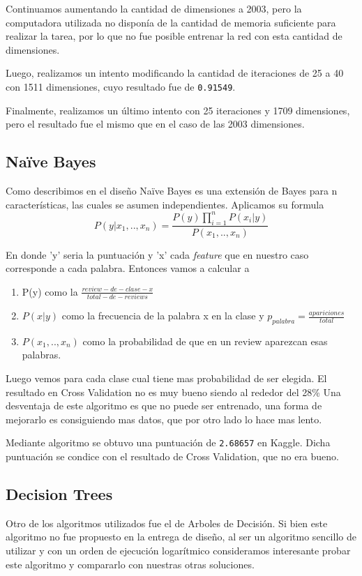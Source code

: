 \documentclass[10pt,a4paper]{article}
\begin{document}
Continuamos aumentando la cantidad de dimensiones a 2003, pero la computadora utilizada no disponía de la cantidad de memoria suficiente para realizar la tarea, por lo que no fue posible entrenar la red con esta cantidad de dimensiones.

Luego, realizamos un intento modificando la cantidad de iteraciones de 25 a 40 con 1511 dimensiones, cuyo resultado fue de \texttt{0.91549}.

Finalmente, realizamos un último intento con 25 iteraciones y 1709 dimensiones, pero el resultado fue el mismo que en el caso de las 2003 dimensiones. 

\subsection{Naïve Bayes}
Como describimos en el diseño Naïve Bayes es una extensión de Bayes para n características, las cuales se asumen independientes. Aplicamos su formula
\begin{equation*}
    P(y|x_1,..,x_n) = \frac {P(y)\prod_{i = 1}^{n} {P(x_i|y)}} {P(x_1,..,x_n)}
\end{equation*}

En donde 'y' seria la puntuación y 'x' cada \textit{feature} que en nuestro caso corresponde a cada palabra. Entonces vamos a calcular a 

\begin{enumerate}
    \item P(y) como la $\frac {review-de-clase-x}{total-de-reviews}$
    \item $P(x|y)$ como la frecuencia de la palabra x en la clase y $ p_{palabra} = \frac{apariciones}{total} $ 
    \item $P(x_1,..,x_n)$ como la probabilidad de que en un review aparezcan esas palabras.
\end{enumerate}

Luego vemos para cada clase cual tiene mas probabilidad de ser elegida. El resultado en Cross Validation no es muy bueno siendo al rededor del 28\% 
Una desventaja de este algoritmo es que no puede ser entrenado, una forma de mejorarlo es consiguiendo mas datos, que por otro lado lo hace mas lento.

Mediante algoritmo se obtuvo una puntuación de \texttt{2.68657} en Kaggle. Dicha puntuación se condice con el resultado de Cross Validation, que no era bueno. 

\subsection{Decision Trees}
Otro de los algoritmos utilizados fue el de Arboles de Decisión. Si bien este algoritmo no fue propuesto en la entrega de diseño, al ser un algoritmo sencillo de utilizar y con un orden de ejecución logarítmico \cite{sklearn_dtree} consideramos interesante probar este algoritmo y compararlo con nuestras otras soluciones.
\end{document}
